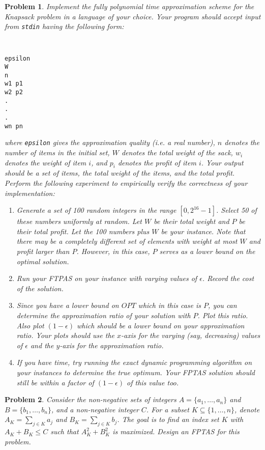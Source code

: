 \documentclass[11pt]{article}
\newtheorem{problem}{Problem}
\begin{document}
\begin{problem}
Implement the fully polynomial time approximation scheme for the {\sc Knapsack} problem in a language of your choice.  Your program should accept input from {\tt stdin} having the following form:
{\tt
\begin{verbatim}
epsilon
W
n
w1 p1
w2 p2
.
.
.
wn pn

\end{verbatim}
}
where {\tt epsilon} gives the approximation quality (i.e. a real number), $n$ denotes the number of items in the initial set, $W$ denotes the total weight of the sack, $w_{i}$ denotes the weight of item $i$, and $p_{i}$ denotes the profit of item $i$.  Your output should be a set of items, the total weight of the items, and the total profit.  Perform the following experiment to empirically verify the correctness of your implementation:
\begin{enumerate}
	\item Generate a set of 100 random integers in the range $[0,2^{16}-1]$.  Select 50 of these numbers uniformly at random.  Let $W$ be their total weight and $P$ be their total profit.  Let the 100 numbers plus $W$ be your instance.  Note that there may be a completely different set of elements with weight at most $W$ and profit larger than $P$.  However, in this case, $P$ serves as a lower bound on the optimal solution.
	\item Run your FTPAS on your instance with varying values of $\epsilon$.  Record the cost of the solution.  
	\item Since you have a lower bound on $OPT$ which in this case is $P$, you can determine the approximation ratio of your solution with $P$.  Plot this ratio.  Also plot $(1-\epsilon)$ which should be a lower bound on your approximation ratio.  Your plots should use the $x$-axis for the varying (say, decreasing) values of $\epsilon$ and the $y$-axis for the approximation ratio.
	\item If you have time, try running the exact dynamic programming algorithm on your instances to determine the true optimum.  Your FPTAS solution should still be within a factor of $(1-\epsilon)$ of this value too.
\end{enumerate}
\end{problem}

\begin{problem}
Consider the non-negative sets of integers $A=\{a_{1}, \ldots, a_{n}\}$ and $B=\{b_{1}, \ldots, b_{n}\}$, and a non-negative integer $C$.  For a subset $K \subseteq \{1, \ldots, n\}$, denote $A_{K}=\sum_{j \in K} a_{j}$ and $B_{K} = \sum_{j \in K} b_{j}$.  The goal is to find an index set $K$ with $A_{K} + B_{K} \leq C$ such that $A_{K}^{2} + B_{K}^{2}$ is maximized.  Design an FPTAS for this problem. 
\end{problem}
\end{document}

